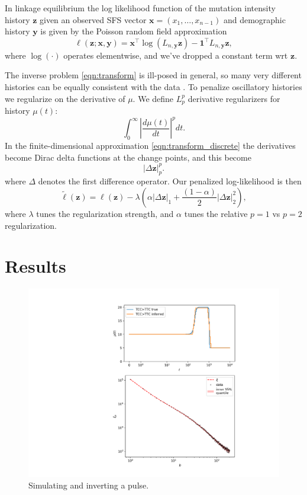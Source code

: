 \documentclass[11pt]{article}
\begin{document}
In linkage equilibrium the log likelihood function of the mutation intensity history $\boldsymbol z$ given an observed SFS vector $\boldsymbol x = (x_1,\dots,x_{n-1})$ and demographic history $\boldsymbol y$ is given by the Poisson random field approximation \citep{}
\[
\ell(\boldsymbol z; \boldsymbol x, \boldsymbol y) = \boldsymbol x^\intercal\log(L_{n, \boldsymbol y} \boldsymbol z) - \boldsymbol 1^\intercal L_{n, \boldsymbol y} \boldsymbol z,
\]
where $\log(\cdot)$ operates elementwise, and we've dropped a constant term wrt $\boldsymbol z$.

The inverse problem \eqref{eqn:transform} is ill-posed in general, so many very different histories can be equally consistent with the data \citep{oscillation paper? Yun's other papers?}.
To penalize oscillatory histories we regularize on the derivative of $\mu$.
We define $L_p^p$ derivative regularizers for history $\mu(t)$:
\[
\int_0^\infty\left|\frac{d\mu(t)}{dt}\right|^p dt.
\]
In the finite-dimensional approximation \eqref{eqn:transform_discrete} the derivatives become Dirac delta functions at the change points, and this become
\[
\left|\Delta\boldsymbol z\right|_p^p.
\]
where $\Delta$ denotes the first difference operator.
Our penalized log-likelihood is then
\begin{equation}
\label{eqn:penalized}
\tilde\ell(\boldsymbol z) = \ell(\boldsymbol z) - \lambda \left(\alpha\left|\Delta\boldsymbol z\right|_1 + \frac{(1-\alpha)}{2}\left|\Delta\boldsymbol z\right|_2^2\right),
\end{equation}
where $\lambda$ tunes the regularization strength, and $\alpha$ tunes the relative $p=1$ vs $p=2$ regularization.


\section{Results}\label{sec:results}


\begin{figure}
  \centering
  \includegraphics[width=.7\textwidth]{figures/fit_teaser}
  \caption{Simulating and inverting a pulse.}
  \label{}
\end{figure}
\end{document}
